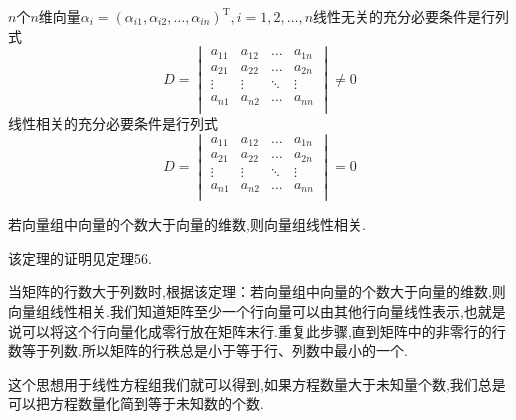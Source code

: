 \begin{ttheorem}
    $n$个$n$维向量$\alpha_i=(\alpha_{i1},\alpha_{i2},\dots,\alpha_{in})^\mathrm{T},i=1,2,\dots,n$线性无关的充分必要条件是行列式
    \begin{equation*}
        D=
        \begin{vmatrix}
            a_{11}   &   a_{12}   &   \dots   &   a_{1n}   \\
            a_{21}   &   a_{22}   &   \dots   &   a_{2n}   \\
            \vdots   &   \vdots   &   \ddots   &   \vdots   \\
            a_{n1}   &   a_{n2}   &   \dots   &   a_{nn}   \\
        \end{vmatrix}\neq 0
    \end{equation*}
    线性相关的充分必要条件是行列式
    \begin{equation*}
        D=
        \begin{vmatrix}
            a_{11}   &   a_{12}   &   \dots   &   a_{1n}   \\
            a_{21}   &   a_{22}   &   \dots   &   a_{2n}   \\
            \vdots   &   \vdots   &   \ddots   &   \vdots   \\
            a_{n1}   &   a_{n2}   &   \dots   &   a_{nn}   \\
        \end{vmatrix}= 0
    \end{equation*}
\end{ttheorem}
\begin{ttheorem}
    若向量组中向量的个数大于向量的维数,则向量组线性相关.
\end{ttheorem}
该定理的证明见定理56.

当矩阵的行数大于列数时,根据该定理：若向量组中向量的个数大于向量的维数,则向量组线性相关.我们知道矩阵至少一个行向量可以由其他行向量线性表示,也就是说可以将这个行向量化成零行放在矩阵末行.重复此步骤,直到矩阵中的非零行的行数等于列数.所以矩阵的行秩总是小于等于行、列数中最小的一个.

这个思想用于线性方程组我们就可以得到,如果方程数量大于未知量个数,我们总是可以把方程数量化简到等于未知数的个数.

